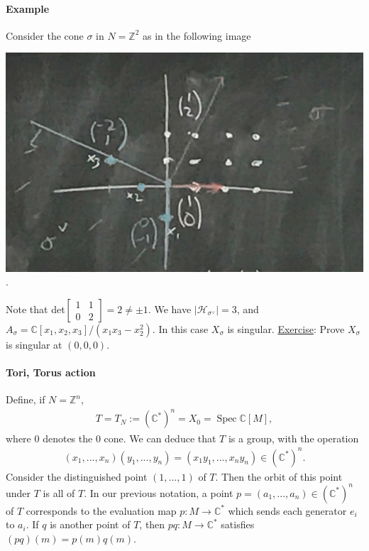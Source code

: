 \documentclass[a4paper,12pt]{amsart}
\newcommand{\ZZ}{\mathbb{Z}}
\newcommand{\CC}{\mathbb{C}}
\DeclareMathOperator{\Spec}{Spec}
\begin{document}
\paragraph{Example}
Consider the cone $\sigma$ in $N = \ZZ^2$ as in the following image
\begin{center}
\includegraphics[scale=0.4]{pic/toricvar_feb12_1}.
\end{center}
Note that det$\begin{bmatrix}
1 & 1 \\
0 & 2 
\end{bmatrix} = 2 \neq \pm 1$. We have $|\mathcal{H}_{\sigma^\vee}| = 3$, and $A_\sigma = \CC[x_1, x_2, x_3] / (x_1 x_3 - x_2^2)$. In this case $X_\sigma$ is singular. \underline{Exercise}: Prove $X_\sigma$ is singular at $(0,0,0)$.

\paragraph{Tori, Torus action}
Define, if $N = \ZZ^n$, 
\begin{align*}
	T = T_N := (\CC^*)^n = X_0 = \Spec \CC[M],
\end{align*}
where $0$ denotes the $0$ cone. We can deduce that $T$ is a group, with the operation 
\begin{align*}
	(x_1, ..., x_n)(y_1, ..., y_n) = (x_1 y_1, ... , x_n y_n) \in (\CC^*)^n.
\end{align*}
Consider the distinguished point $(1, ..., 1)$ of $T$. Then the orbit of this point under $T$ is all of $T$. In our previous notation, a point $p = (a_1, ..., a_n) \in (\CC^*)^n$ of $T$ corresponds to the evaluation map $p: M \to \CC^*$ which sends each generator $e_i$ to $a_i$. If $q$ is another point of $T$, then $pq: M \to \CC^*$ satisfies $(pq)(m) = p(m) q(m)$. \\
\end{document}
